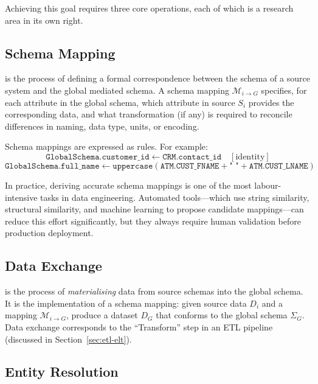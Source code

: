 Achieving this goal requires three core operations, each of which is a
research area in its own right.

\subsection{Schema Mapping}
\label{subsec:schema-mapping}

 is the process of defining a formal correspondence
between the schema of a source system and the global mediated schema.
A schema mapping $\mathcal{M}_{i \to G}$ specifies, for each attribute
in the global schema, which attribute in source $S_i$ provides the
corresponding data, and what transformation (if any) is required to
reconcile differences in naming, data type, units, or encoding.

Schema mappings are expressed as rules. For example:
\begin{equation}
\texttt{GlobalSchema.customer\_id} \leftarrow \texttt{CRM.contact\_id}
\quad [\text{identity}]
\end{equation}
\begin{equation}
\texttt{GlobalSchema.full\_name} \leftarrow
\texttt{uppercase}(\texttt{ATM.CUST\_FNAME}
+ \texttt{" "} + \texttt{ATM.CUST\_LNAME})
\end{equation}

In practice, deriving accurate schema mappings is one of the most
labour-intensive tasks in data engineering. Automated  tools---which use string similarity, structural similarity,
and machine learning to propose candidate mappings---can reduce this
effort significantly, but they always require human validation before
production deployment.

\subsection{Data Exchange}
\label{subsec:data-exchange}

 is the process of \emph{materialising} data from
source schemas into the global schema. It is the implementation of a
schema mapping: given source data $D_i$ and a mapping
$\mathcal{M}_{i \to G}$, produce a dataset $D_G$ that conforms to the
global schema $\Sigma_G$. Data exchange corresponds to the
``Transform'' step in an ETL pipeline (discussed in
Section~\ref{sec:etl-elt}).

\subsection{Entity Resolution}
\label{subsec:entity-resolution}


